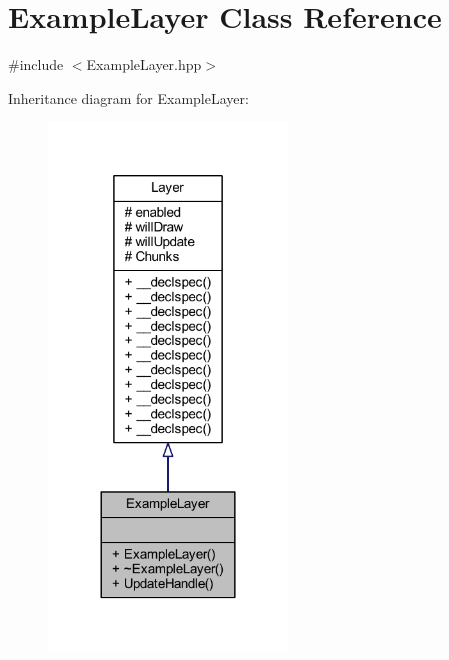 \hypertarget{class_example_layer}{\section{Example\-Layer Class Reference}
\label{class_example_layer}
}


{\ttfamily \#include $<$Example\-Layer.\-hpp$>$}



Inheritance diagram for Example\-Layer\-:\nopagebreak
\begin{figure}[H]
\begin{center}
\leavevmode
\includegraphics[width=180pt]{class_example_layer__inherit__graph}
\end{center}
\end{figure}


